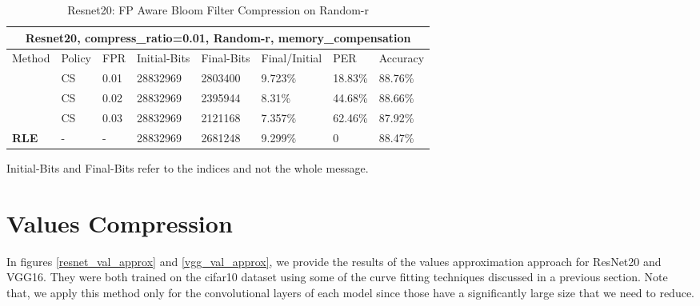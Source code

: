     \vspace{1cm}

    \begin{table}[h!]
    \footnotesize
     \centering
    \begin{tabular}{ |p{3cm}||p{1cm}|p{1cm}|p{2cm}|p{1.6cm}|p{1.6cm}|p{1.3cm}|p{1.5cm}|}
    \hline
    \multicolumn{8}{|c|}{\textbf{\footnotesize Resnet20, compress\_ratio=0.01, Random-r, memory\_compensation}} \\
    \hline
    \rule{0pt}{3ex}
    	Method & Policy & FPR  &Initial-Bits &Final-Bits &Final/Initial & PER & Accuracy\\
    \hline
    \rule{0pt}{3ex}
    \multirow{4}{*}{\textbf{Fp-Aware Bloom}}
    & CS   &0.01     &   28832969 &   2803400 &    9.723\%  &18.83\%   &88.76\%\\
    & CS   &0.02     &   28832969 &   2395944 &    8.31\%   &44.68\%   &88.66\%\\
    & CS   &0.03     &   28832969 &   2121168 &    7.357\%  &62.46\%   &87.92\%\\
    \hline
    \rule{0pt}{3ex}
    \textbf{RLE}    & - & - & 28832969 & 2681248 & 9.299\%  &0   &88.47\%\\
    \hline
    \end{tabular}
    \caption{Resnet20: FP Aware Bloom Filter Compression on Random-r}
    Initial-Bits and Final-Bits refer to the indices and not the whole message. 
    \label{table:5}
    \end{table}


    \newpage
    \section{Values Compression}
    
    In figures \ref{resnet_val_approx} and \ref{vgg_val_approx}, we provide the results of the values approximation approach for ResNet20 and VGG16. 
    They were both trained on the cifar10 dataset using some of the curve fitting techniques discussed in a previous section.
    Note that, we apply this method only for the convolutional layers of each model since those have a significantly large size that we need to reduce.
    
